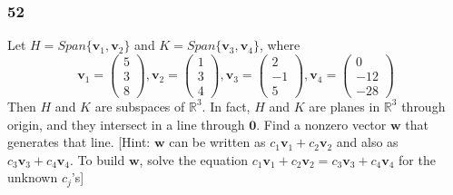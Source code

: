     \subsubsection*{52}
      Let $ H = Span\{\mathbf v_1, \mathbf v_2\} $ and $ K = Span\{\mathbf v_3, \mathbf v_4\}$, where 
      \[
      \mathbf v_1 = \begin{pmatrix}
         5  \\ 
         3  \\ 
         8 
      \end{pmatrix}, 
      \mathbf v_2 = \begin{pmatrix}
         1  \\ 
         3  \\ 
         4 
      \end{pmatrix}, 
      \mathbf v_3 = \begin{pmatrix}
         2  \\ 
         -1  \\ 
         5 
      \end{pmatrix}, 
      \mathbf v_4 = \begin{pmatrix}
         0  \\ 
         -12  \\ 
         -28 
      \end{pmatrix} 
      \]
      Then $ H $ and $ K $ are subspaces of $ \mathbb R^{3} $. In fact, $ H $ and $ K $ are planes in $ \mathbb R^{3} $ through origin, and they intersect in a line through $ \mathbf 0 $. Find a nonzero vector $ \mathbf w $ that generates that line. [Hint: $ \mathbf w $ can be written as $ c_1 \mathbf v_1 + c_2 \mathbf v_2 $ and also as $ c_3 \mathbf v_3 + c_4 \mathbf v_4 $. To build $ \mathbf w $, solve the equation $ c_1 \mathbf v_1 + c_2 \mathbf v_2  = c_3 \mathbf v_3 + c_4 \mathbf v_4  $ for the unknown $ c_j $'s] \newline \newline 



      \[
      
      \]
    